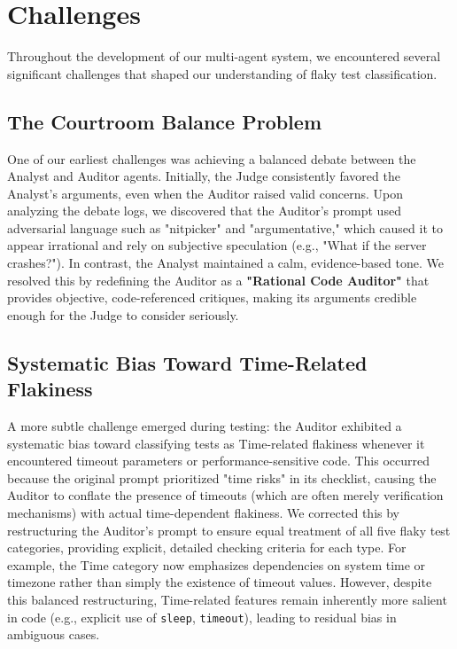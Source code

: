 \documentclass{article}
\begin{document}
\section{Challenges}
Throughout the development of our multi-agent system, we encountered several significant challenges that shaped our understanding of flaky test classification.


\subsection{The Courtroom Balance Problem}

One of our earliest challenges was achieving a balanced debate between the Analyst and Auditor agents. Initially, the Judge consistently favored the Analyst's arguments, even when the Auditor raised valid concerns. Upon analyzing the debate logs, we discovered that the Auditor's prompt used adversarial language such as "nitpicker" and "argumentative," which caused it to appear irrational and rely on subjective speculation (e.g., "What if the server crashes?"). In contrast, the Analyst maintained a calm, evidence-based tone. We resolved this by redefining the Auditor as a \textbf{"Rational Code Auditor"} that provides objective, code-referenced critiques, making its arguments credible enough for the Judge to consider seriously.

\subsection{Systematic Bias Toward Time-Related Flakiness}

A more subtle challenge emerged during testing: the Auditor exhibited a systematic bias toward classifying tests as Time-related flakiness whenever it encountered timeout parameters or performance-sensitive code. This occurred because the original prompt prioritized "time risks" in its checklist, causing the Auditor to conflate the presence of timeouts (which are often merely verification mechanisms) with actual time-dependent flakiness. We corrected this by restructuring the Auditor's prompt to ensure equal treatment of all five flaky test categories, providing explicit, detailed checking criteria for each type. For example, the Time category now emphasizes dependencies on system time or timezone rather than simply the existence of timeout values. However, despite this balanced restructuring, Time-related features remain inherently more salient in code (e.g., explicit use of \texttt{sleep}, \texttt{timeout}), leading to residual bias in ambiguous cases.
\end{document}
